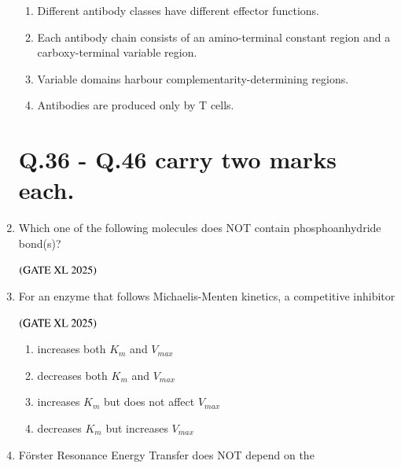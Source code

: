 \documentclass[journal]{IEEEtran}
\begin{document}
\begin{enumerate}
    \begin{enumerate}
        \item Different antibody classes have different effector functions.
        \item Each antibody chain consists of an amino-terminal constant region and a carboxy-terminal variable region.
        \item Variable domains harbour complementarity-determining regions.
        \item Antibodies are produced only by T cells.
    \end{enumerate}

\section*{Q.36 - Q.46 carry two marks each.}

    \item Which one of the following molecules does NOT contain phosphoanhydride bond(s)?

    \hfill $\left(\text{GATE XL 2025}\right)$

    \begin{enumerate}
    \end{enumerate}

    \item For an enzyme that follows Michaelis-Menten kinetics, a competitive inhibitor

    \hfill $\left(\text{GATE XL 2025}\right)$

    \begin{enumerate}
        \item increases both $K_m$ and $V_{max}$
        \item decreases both $K_m$ and $V_{max}$
        \item increases $K_m$ but does not affect $V_{max}$
        \item decreases $K_m$ but increases $V_{max}$
    \end{enumerate}

    \item Förster Resonance Energy Transfer does NOT depend on the


\end{enumerate}
\end{document}
